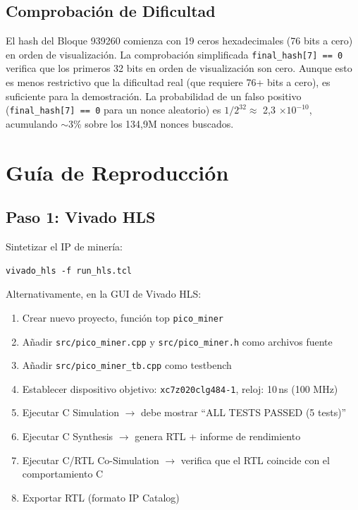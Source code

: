 \documentclass[12pt,a4paper]{article}
\begin{document}
\subsection{Comprobaci\'on de Dificultad}

El hash del Bloque 939260 comienza con 19 ceros hexadecimales (76 bits a cero)
en orden de visualizaci\'on. La comprobaci\'on simplificada \texttt{final\_hash[7] == 0}
verifica que los primeros 32 bits en orden de visualizaci\'on son cero. Aunque esto
es menos restrictivo que la dificultad real (que requiere 76+ bits a cero), es
suficiente para la demostraci\'on. La probabilidad de un falso positivo
(\texttt{final\_hash[7] == 0} para un nonce aleatorio) es $1/2^{32} \approx$
2,3 $\times 10^{-10}$, acumulando $\sim$3\% sobre los 134,9M nonces buscados.

\section{Gu\'ia de Reproducci\'on}

\subsection{Paso 1: Vivado HLS}

Sintetizar el IP de miner\'ia:

\begin{lstlisting}[style=tclstyle]
vivado_hls -f run_hls.tcl
\end{lstlisting}

Alternativamente, en la GUI de Vivado HLS:
\begin{enumerate}[leftmargin=2em]
    \item Crear nuevo proyecto, funci\'on top \texttt{pico\_miner}
    \item A\~nadir \texttt{src/pico\_miner.cpp} y \texttt{src/pico\_miner.h} como archivos fuente
    \item A\~nadir \texttt{src/pico\_miner\_tb.cpp} como testbench
    \item Establecer dispositivo objetivo: \texttt{xc7z020clg484-1}, reloj: 10\,ns (100 MHz)
    \item Ejecutar C Simulation $\rightarrow$ debe mostrar ``ALL TESTS PASSED (5 tests)''
    \item Ejecutar C Synthesis $\rightarrow$ genera RTL + informe de rendimiento
    \item Ejecutar C/RTL Co-Simulation $\rightarrow$ verifica que el RTL coincide con el comportamiento C
    \item Exportar RTL (formato IP Catalog)
\end{enumerate}
\end{document}
